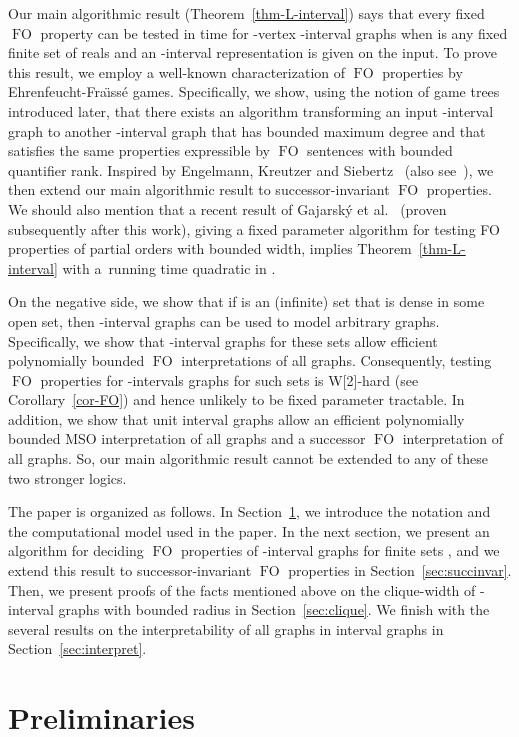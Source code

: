 \documentclass{CSML}
\newcommand{\FO}{\ensuremath{\operatorname{FO}}\xspace}
\theoremstyle{plain}\newtheorem{claim}[thm]{Claim}
\begin{document}
Our main algorithmic result (Theorem~\ref{thm-L-interval}) says that
every fixed \FO property can be tested
in time  for -vertex -interval graphs when 
 is any fixed finite set of reals and an -interval representation is
given on the input.
To prove this result, we employ a well-known characterization of \FO properties
by Ehrenfeucht-Fra{\"\i}ss\'e games. Specifically,
we show, using the notion of game trees introduced later, that
there exists an algorithm transforming an input -interval graph to another -interval
graph that has bounded maximum degree and that satisfies the same properties expressible
by \FO sentences with bounded quantifier rank.
Inspired by Engelmann, Kreutzer and Siebertz~\cite{EKS12} (also see~\cite{EKK13}),
we then extend our main algorithmic result to successor-invariant
\FO properties.
We should also mention that a recent result of Gajarsk\'y et 
al.~\cite{gajetal15} (proven subsequently after this work),
giving a fixed parameter algorithm for testing
FO properties of partial orders with bounded width, implies
Theorem~\ref{thm-L-interval} with a~running time quadratic in .

On the negative side, we show that if  is an (infinite) set that is dense
in some open set, then -interval graphs can be used to model arbitrary graphs.
Specifically, we show that -interval graphs for these sets  allow
efficient polynomially bounded \FO interpretations of all graphs. Consequently,
testing \FO properties for -intervals graphs for such sets  is 
W[2]-hard (see Corollary~\ref{cor-FO}) and hence unlikely to be fixed parameter tractable.
In addition, we show that unit interval graphs allow an efficient polynomially bounded
MSO interpretation of all graphs and a successor \FO interpretation of all graphs.
So, our main algorithmic result cannot be extended to any of these two stronger logics.

The paper is organized as follows.
In Section~\ref{sec:preliminary}, we introduce the notation and the computational
model used in the paper. In the next section, we present an 
algorithm for deciding \FO properties of -interval graphs for finite sets ,
and we extend this result to successor-invariant \FO properties
in Section~\ref{sec:succinvar}.
Then, we present proofs of the facts mentioned above
on the clique-width of -interval graphs with bounded radius in Section~\ref{sec:clique}.
We finish with the several results on the interpretability of all graphs in interval graphs in Section~\ref{sec:interpret}.


\section{Preliminaries}
\label{sec:preliminary}
\end{document}

